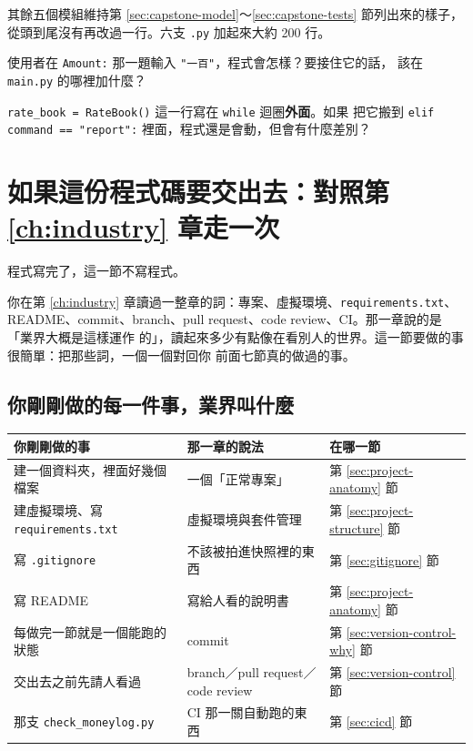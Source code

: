 其餘五個模組維持第 \ref{sec:capstone-model}～\ref{sec:capstone-tests} 節列出來的樣子，
從頭到尾沒有再改過一行。六支 \texttt{.py} 加起來大約 200 行。

\begin{drills}[label=drills:capstone-wiring]
\item 使用者在 \texttt{Amount:} 那一題輸入 \texttt{"一百"}，程式會怎樣？要接住它的話，
該在 \texttt{main.py} 的哪裡加什麼？
\item \texttt{rate\_book = RateBook()} 這一行寫在 \texttt{while} 迴圈\textbf{外面}。如果
把它搬到 \texttt{elif command == "report":} 裡面，程式還是會動，但會有什麼差別？
\end{drills}

\section{如果這份程式碼要交出去：對照第 \ref{ch:industry} 章走一次}
\label{sec:capstone-handoff}

程式寫完了，這一節不寫程式。

你在第 \ref{ch:industry} 章讀過一整章的詞：專案、虛擬環境、\texttt{requirements.txt}、
README、commit、branch、pull request、code review、CI。那一章說的是「業界大概是這樣運作
的」，讀起來多少有點像在看別人的世界。這一節要做的事很簡單：把那些詞，一個一個對回你
前面七節真的做過的事。

\subsection*{你剛剛做的每一件事，業界叫什麼}

\begin{center}
\begin{tabular}{@{}p{5.2cm}p{5.2cm}p{2.4cm}@{}}
\toprule
你剛剛做的事 & 那一章的說法 & 在哪一節 \\
\midrule
建一個資料夾，裡面好幾個檔案 & 一個「正常專案」 & 第 \ref{sec:project-anatomy} 節 \\
建虛擬環境、寫 \texttt{requirements.txt} & 虛擬環境與套件管理 & 第 \ref{sec:project-structure} 節 \\
寫 \texttt{.gitignore} & 不該被拍進快照裡的東西 & 第 \ref{sec:gitignore} 節 \\
寫 README & 寫給人看的說明書 & 第 \ref{sec:project-anatomy} 節 \\
每做完一節就是一個能跑的狀態 & commit & 第 \ref{sec:version-control-why} 節 \\
交出去之前先請人看過 & branch／pull request／code review & 第 \ref{sec:version-control} 節 \\
那支 \texttt{check\_moneylog.py} & CI 那一關自動跑的東西 & 第 \ref{sec:cicd} 節 \\
\bottomrule
\end{tabular}
\end{center}

